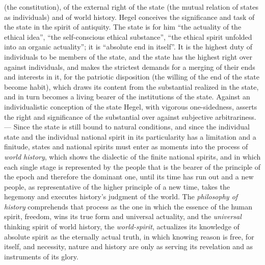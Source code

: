(the constitution), of the external right of the state (the mutual
relation of states as individuals) and of world history. Hegel conceives
the significance and task of the state in the spirit of antiquity. The
state is for him ``the actuality of the ethical idea'', ``the
self-conscious ethical substance'', ``the ethical spirit unfolded into
an organic actuality''; it is ``absolute end in itself''. It is the
highest duty of individuals to be members of the state, and the state
has the highest right over against individuals, and makes the strictest
demands for a merging of their ends and interests in it, for the
patriotic disposition (the willing of the end of the state become
habit), which draws its content from the substantial realized in the
state, and in turn becomes a living bearer of the institutions of the
state. Against an individualistic conception of the state Hegel, with
vigorous one-sidedness, asserts the right and significance of the
substantial over against subjective arbitrariness. --- Since the state
is still bound to natural conditions, and since the individual state and
the individual national spirit in its particularity has a
limitation and a finitude, states and national spirits must
enter as moments into the process of \emph{world history}, which shows
the dialectic of the finite national spirits, and in which each single
stage is represented by the people that is the bearer of the principle
of the epoch and therefore the dominant one, until its time has run out
and a new people, as representative of the higher principle of a new
time, takes the hegemony and executes history's judgment of the world.
The \emph{philosophy of history} comprehends that process as the one in
which the essence of the human spirit, freedom, wins its true form and
universal actuality, and the \emph{universal} thinking spirit of world
history, the \emph{world-spirit}, actualizes its knowledge of absolute
spirit as the eternally actual truth, in which knowing reason is free,
for itself, and necessity, nature and history are only as serving its
revelation and as instruments of its glory.

